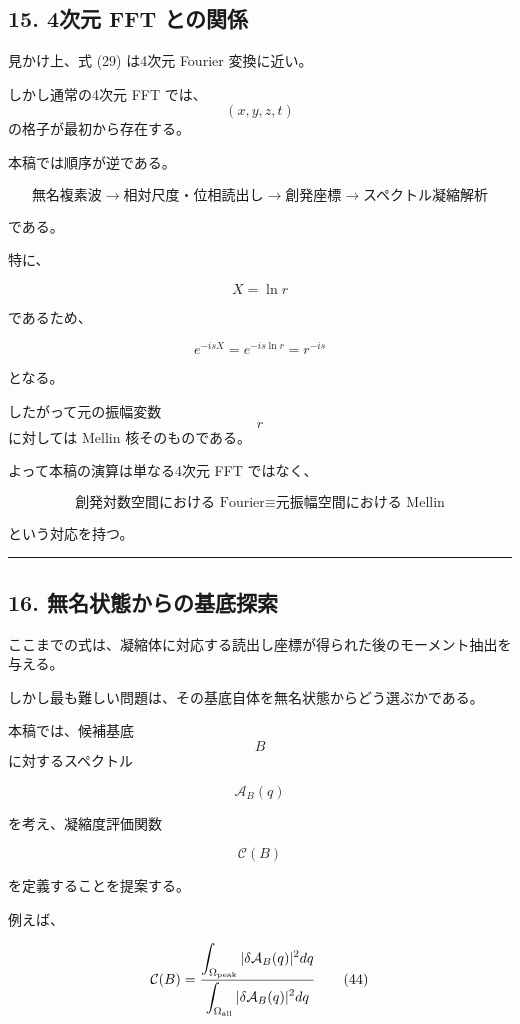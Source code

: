 \documentclass[
  a4paper,
]{ltjsarticle}
\begin{document}
\subsection{15. 4次元 FFT
との関係}\label{ux6b21ux5143-fft-ux3068ux306eux95a2ux4fc2}

見かけ上、式 (29) は4次元 Fourier 変換に近い。

しかし通常の4次元 FFT では、\[ (x,y,z,t) \] の格子が最初から存在する。

本稿では順序が逆である。

\[
\boxed{
\text{無名複素波}
\rightarrow
\text{相対尺度・位相読出し}
\rightarrow
\text{創発座標}
\rightarrow
\text{スペクトル凝縮解析}
}
\tag{43}
\]

である。

特に、

\[
X=\ln r
\]

であるため、

\[
e^{-isX}
=
e^{-is\ln r}
=
r^{-is}
\]

となる。

したがって元の振幅変数 \[r\] に対しては Mellin 核そのものである。

よって本稿の演算は単なる4次元 FFT ではなく、

\[
\boxed{
\text{創発対数空間における Fourier}
\equiv
\text{元振幅空間における Mellin}
}
\]

という対応を持つ。

\begin{center}\rule{0.5\linewidth}{0.5pt}\end{center}

\subsection{16.
無名状態からの基底探索}\label{ux7121ux540dux72b6ux614bux304bux3089ux306eux57faux5e95ux63a2ux7d22}

ここまでの式は、凝縮体に対応する読出し座標が得られた後のモーメント抽出を与える。

しかし最も難しい問題は、その基底自体を無名状態からどう選ぶかである。

本稿では、候補基底 \[B\] に対するスペクトル

\[
\mathcal A_B(q)
\]

を考え、凝縮度評価関数

\[
\mathcal C(B)
\]

を定義することを提案する。

例えば、

\[
\mathcal C(B)
=
\frac{
\displaystyle
\int_{\Omega_{\rm peak}}
|\delta\mathcal A_B(q)|^2dq
}{
\displaystyle
\int_{\Omega_{\rm all}}
|\delta\mathcal A_B(q)|^2dq
}
\tag{44}
\]
\end{document}
